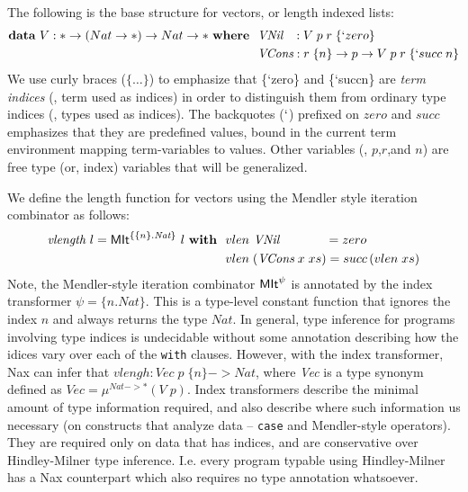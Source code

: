 The following is the base structure for vectors, or length indexed lists:
\begin{align*}
\textbf{data}~V : * -> (Nat -> *) -> Nat -> * ~\textbf{where}~~
& \textit{VNil}~~\, : V\;p\;r\;\{`zero\} \\
& \textit{VCons}    : r\;\{n\} -> p -> V\;p\;r\;\{`succ\;n\}
\end{align*}
We use curly braces ($\{\dots\}$) to emphasize that
\{`zero\} and 
\{`succ\;n\}
are \emph{term indices}
(\ie, term used as indices) in order to distinguish them from ordinary
type indices (\ie, types used as indices). The backquotes ($`$) prefixed
on $zero$ and $succ$ emphasizes that they are predefined values, bound
in the current term environment mapping term-variables to values. Other
variables (\eg, $p$,$r$,and $n$) are
free type (or, index) variables that will be generalized.

We define the length function for vectors using the Mendler style
iteration combinator as follows:
\begin{align*}
\textit{vlength}~l = \textsf{MIt}^{\{\{n\} . \textit{Nat}\}}~l~\textbf{with}~~
&  vlen ~\textit{VNil}~~~~~~~~~~~ = zero \\
&  vlen \;(\textit{VCons}\;x\;xs) = succ\,(vlen\;xs)
\end{align*}
Note, the Mendler-style iteration combinator $\textsf{MIt}^\psi$ is annotated by
the index transformer $\psi = \{n . \textit{Nat}\}$. This is a type-level constant
function that ignores the index $n$ and always returns the 
type $\textit{Nat}$. In general, type inference for programs involving
type indices is undecidable without some annotation describing
how the idices vary over each of the \verb+with+ clauses. However, with the index transformer,
Nax can infer that
$vlengh : \textit{Vec}\;p\;\{n\} -> \textit{Nat}$, where
\textit{Vec} is a type synonym defined as
$\textit{Vec} = \mu^{\textit{Nat} -> *}(V\;p)$. Index transformers describe the minimal
amount of type information required, and also describe where such information
us necessary (on constructs that analyze data -- \verb+case+ and Mendler-style operators).
They are required only on data that has indices, and are conservative over Hindley-Milner
type inference. I.e. every program typable using Hindley-Milner has a Nax counterpart which
also requires no type annotation whatsoever.



